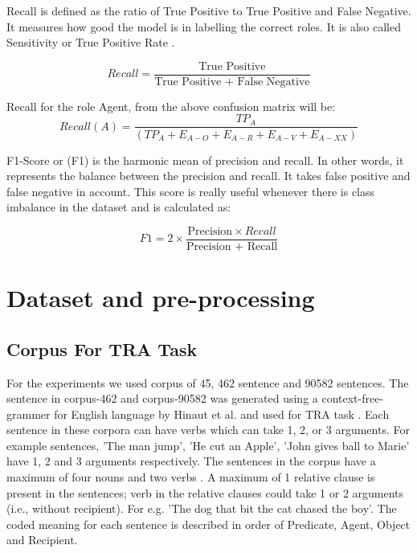 \noindent Recall is defined as the ratio of True Positive to True Positive and False Negative. It measures how good the model is in labelling the correct roles. It is also called Sensitivity or True Positive Rate \cite{classification_scores:2009}.

\begin{equation}\label{eqn:recall}
Recall = \frac{\text{True Positive}}{\text{True Positive + False Negative}}
\end{equation}

Recall for the role Agent, from the above confusion matrix will be:
\[Recall(A) = \frac{TP_{A}}{(TP_{A}+E_{A-O}+E_{A-R}+E_{A-V}+E_{A-XX})}\]

\noindent F1-Score or (F1) is the harmonic mean of precision and recall. In other words, it represents the balance between the precision and recall. It takes false positive and false negative in account. This score is really useful whenever there is class imbalance in the dataset \cite{classification_scores:2009} and is calculated as:

\begin{equation}\label{eqn:precision}
F1 = 2\times \frac{\text{Precision} \times{Recall }}{\text{Precision + Recall}}
\end{equation}

\newpage

\section{Dataset and pre-processing}

\subsection{Corpus For TRA Task}

For the experiments we used corpus of 45, 462 sentence and 90582 sentences. The sentence in corpus-462 and corpus-90582 was generated using a context-free-grammer for English language by Hinaut et al. and used for TRA task \cite{xavier:2013:RT}. Each sentence in these corpora can have verbs which can take 1, 2, or 3 arguments. For example sentences, 'The man jump', 'He cut an Apple', 'John gives ball to Marie' have 1, 2 and 3 arguments respectively. The sentences in the corpus have a maximum of four nouns and two verbs \cite{xavier:2013:RT}. A maximum of 1 relative clause is present in the sentences; verb in the relative clauses could take 1 or 2 arguments (i.e., without recipient). For e.g. 'The dog that bit the cat chased the boy'. The coded meaning for each sentence is described in order of Predicate, Agent, Object and Recipient. 

